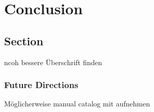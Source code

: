 \chapter{Conclusion}\label{chapter:Conclusion}

\section{Section}
ncoh bessere Überschrift finden

\subsection{Future Directions}
Möglicherweise manual catalog mit aufnehmen